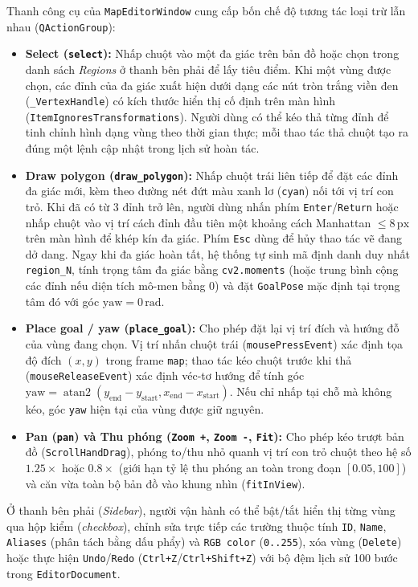 Thanh công cụ của \texttt{MapEditorWindow} cung cấp bốn chế độ tương tác loại trừ lẫn nhau (\texttt{QActionGroup}):
\begin{itemize}[leftmargin=1.2cm]
  \item \textbf{Select (\texttt{select}):} Nhấp chuột vào một đa giác trên bản đồ hoặc chọn trong danh sách \textit{Regions} ở thanh bên phải để lấy tiêu điểm. Khi một vùng được chọn, các đỉnh của đa giác xuất hiện dưới dạng các nút tròn trắng viền đen (\texttt{\_VertexHandle}) có kích thước hiển thị cố định trên màn hình (\texttt{ItemIgnoresTransformations}). Người dùng có thể kéo thả từng đỉnh để tinh chỉnh hình dạng vùng theo thời gian thực; mỗi thao tác thả chuột tạo ra đúng một lệnh cập nhật trong lịch sử hoàn tác.
  \item \textbf{Draw polygon (\texttt{draw\_polygon}):} Nhấp chuột trái liên tiếp để đặt các đỉnh đa giác mới, kèm theo đường nét đứt màu xanh lơ (\texttt{cyan}) nối tới vị trí con trỏ. Khi đã có từ 3 đỉnh trở lên, người dùng nhấn phím \texttt{Enter}/\texttt{Return} hoặc nhấp chuột vào vị trí cách đỉnh đầu tiên một khoảng cách Manhattan $\le 8\,\text{px}$ trên màn hình để khép kín đa giác. Phím \texttt{Esc} dùng để hủy thao tác vẽ đang dở dang. Ngay khi đa giác hoàn tất, hệ thống tự sinh mã định danh duy nhất \texttt{region\_N}, tính trọng tâm đa giác bằng \texttt{cv2.moments} (hoặc trung bình cộng các đỉnh nếu diện tích mô-men bằng $0$) và đặt \texttt{GoalPose} mặc định tại trọng tâm đó với góc $\text{yaw} = 0\,\text{rad}$.
  \item \textbf{Place goal / yaw (\texttt{place\_goal}):} Cho phép đặt lại vị trí đích và hướng đỗ của vùng đang chọn. Vị trí nhấn chuột trái (\texttt{mousePressEvent}) xác định tọa độ đích $(x, y)$ trong frame \texttt{map}; thao tác kéo chuột trước khi thả (\texttt{mouseReleaseEvent}) xác định véc-tơ hướng để tính góc $\text{yaw} = \operatorname{atan2}(y_{\text{end}} - y_{\text{start}}, x_{\text{end}} - x_{\text{start}})$. Nếu chỉ nhấp tại chỗ mà không kéo, góc \texttt{yaw} hiện tại của vùng được giữ nguyên.
  \item \textbf{Pan (\texttt{pan}) và Thu phóng (\texttt{Zoom +}, \texttt{Zoom -}, \texttt{Fit}):} Cho phép kéo trượt bản đồ (\texttt{ScrollHandDrag}), phóng to/thu nhỏ quanh vị trí con trỏ chuột theo hệ số $1.25\times$ hoặc $0.8\times$ (giới hạn tỷ lệ thu phóng an toàn trong đoạn $[0.05, 100]$) và căn vừa toàn bộ bản đồ vào khung nhìn (\texttt{fitInView}).
\end{itemize}

Ở thanh bên phải (\textit{Sidebar}), người vận hành có thể bật/tắt hiển thị từng vùng qua hộp kiểm (\textit{checkbox}), chỉnh sửa trực tiếp các trường thuộc tính \texttt{ID}, \texttt{Name}, \texttt{Aliases} (phân tách bằng dấu phẩy) và \texttt{RGB color} (\texttt{0..255}), xóa vùng (\texttt{Delete}) hoặc thực hiện \texttt{Undo}/\texttt{Redo} (\texttt{Ctrl+Z}/\texttt{Ctrl+Shift+Z}) với bộ đệm lịch sử 100 bước trong \texttt{EditorDocument}.

